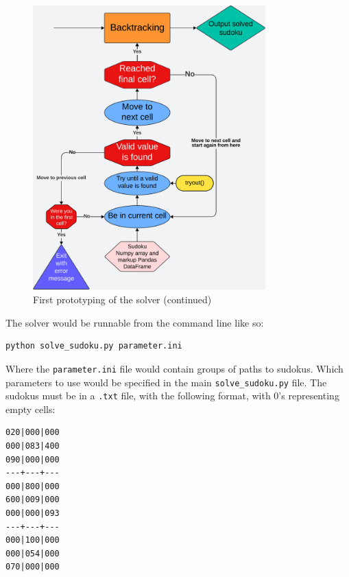 \documentclass[12pt]{report} %
\begin{document}
\begin{figure}[bthp]
  \centering
  \includegraphics[width=0.8\textwidth]{prototyping1_next.png}
  \caption{First prototyping of the solver (continued)}
\end{figure}

\newpage
The solver would be runnable from the command line like so:

\begin{lstlisting}[language=bash]
  python solve_sudoku.py parameter.ini
\end{lstlisting}

Where the \texttt{parameter.ini} file would contain groups of paths to sudokus. Which parameters to use would be specified in the main \texttt{solve\_sudoku.py} file. The sudokus must be in a \texttt{.txt} file, with the following format, with 0's representing empty cells:

\vspace*{1\baselineskip}
\begin{lstlisting}[caption = {Sudoku input format example}]
020|000|000
000|083|400
090|000|000
---+---+---
000|800|000
600|009|000
000|000|093
---+---+---
000|100|000
000|054|000
070|000|000
\end{lstlisting}
\end{document}
